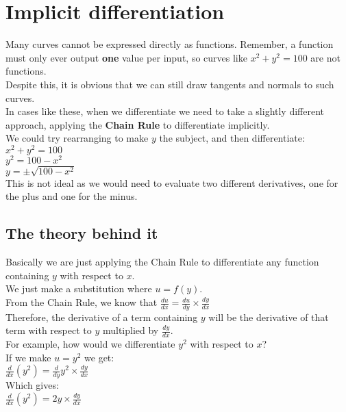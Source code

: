 \documentclass[../main.tex]{subfiles}
\begin{document}
\section{Implicit differentiation}
Many curves cannot be expressed directly as functions. Remember, a function must only ever output \textbf{one} value per input, so curves like \(x^2+y^2=100\) are not functions.\\
Despite this, it is obvious that we can still draw tangents and normals to such curves.\\
In cases like these, when we differentiate we need to take a slightly different approach, applying the \textbf{Chain Rule} to differentiate implicitly.\\

We could try rearranging to make \(y\) the subject, and then differentiate:\\
\(x^2+y^2=100\)\\
\(y^2=100-x^2\)\\
\(y=\pm\sqrt{100-x^2}\)\\
This is not ideal as we would need to evaluate two different derivatives, one for the plus and one for the minus.\\
\subsection*{The theory behind it}
Basically we are just applying the Chain Rule to differentiate any function containing \(y\) with respect to \(x\).\\
We just make a substitution where \(u = f(y)\).\\

From the Chain Rule, we know that \(\frac{du}{dx}=\frac{du}{dy}\times\frac{dy}{dx}\)\\

Therefore, the derivative of a term containing \(y\) will be the derivative of that term with respect to \(y\) multiplied by \(\frac{dy}{dx}\).\\

For example, how would we differentiate \(y^2\) with respect to \(x\)?\\
If we make \(u=y^2\) we get:\\
\(\frac{d}{dx}(y^2)=\frac{d}{dy}y^2\times\frac{dy}{dx}\)\\

Which gives:\\
\(\frac{d}{dx}(y^2)=2y\times\frac{dy}{dx}\)\\
\end{document}
